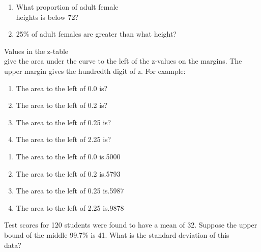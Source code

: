 \documentclass[11pt]{book}\usepackage[]{graphicx}\usepackage[]{color}
\begin{document}
\begin{exercises}
\begin{exercise}
\begin{enumerate}
\item What proportion of adult female \\ heights is below 72?
\item 25\% of adult females are greater than what height?
\end{enumerate}

  \end{exercise}



\begin{exercise} %

Values in the z-table \\ give the area under the curve to the left of the z-values on the margins.  The upper margin gives the hundredth digit of z.  For example:

\begin{enumerate}
\item The area to the left of 0.0 is?
\item The area to the left of 0.2 is?
\item The area to the left of 0.25 is?
\item The area to the left of 2.25 is?
\end{enumerate}

	\end{exercise}
\begin{solution}  %

\begin{enumerate}
\item The area to the left of 0.0 is.5000
\item The area to the left of 0.2 is.5793
\item The area to the left of 0.25 is.5987
\item The area to the left of 2.25 is.9878
\end{enumerate}
\end{solution}


  \begin{exercise} %

    Test scores for 120 students were found to have a mean of 32.  Suppose the upper bound of the middle 99.7\% is  41.  What is the standard deviation of this \\ data?
    

\end{exercise}
\end{exercises}
\end{document}

